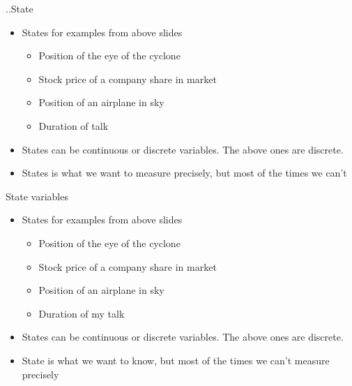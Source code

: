 \documentclass{beamer}
\begin{document}
\begin{frame}{..State}

\begin{itemize}
  \item States for examples from above slides
  \begin{itemize}
    \item Position of the eye of the cyclone
    \item Stock price of a company share in market
    \item Position of an airplane in sky
    \item Duration of talk
  \end{itemize}
  \item States can be continuous or discrete variables. The above ones are discrete.
  \item States is what we want to measure precisely, but most of the times we can't
\end{itemize}
\vskip 1cm
\end{frame}

\begin{frame}{State variables}

\begin{itemize}
  \item States for examples from above slides
  \begin{itemize}
    \item Position of the eye of the cyclone
    \item Stock price of a company share in market
    \item Position of an airplane in sky
    \item Duration of my talk
  \end{itemize}
  \item States can be continuous or discrete variables. The above ones are discrete.
  \item State is what we want to know, but most of the times we can't measure precisely
\end{itemize}
\vskip 1cm
\end{frame}
\end{document}
